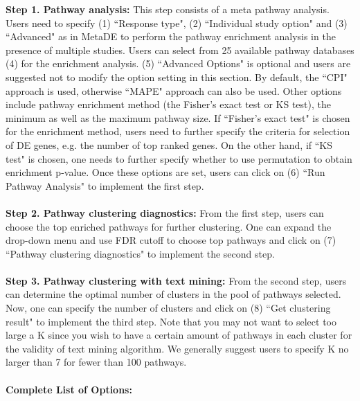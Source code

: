 \textbf{Step 1. Pathway analysis:} This step consists of a meta pathway analysis. Users need to specify (1) ``Response type", (2) ``Individual study option" and (3) ``Advanced" as in MetaDE to perform the pathway enrichment analysis in the presence of multiple studies. Users can select from 25 available pathway databases (4) for the enrichment analysis. (5) ``Advanced Options" is optional and users are suggested not to modify the option setting in this section. By default, the ``CPI" approach is used, otherwise ``MAPE" approach can also be used. Other options include pathway enrichment method (the Fisher's exact test or KS test), the minimum as well as the maximum pathway size. If ``Fisher's exact test" is chosen for the enrichment method, users need to further specify the criteria for selection of DE genes, e.g. the number of top ranked genes. On the other hand, if ``KS test" is chosen, one needs to further specify whether to use permutation to obtain enrichment p-value. Once these options are set, users can click on (6) ``Run Pathway Analysis" to implement the first step. \\~\\

\textbf{Step 2. Pathway clustering diagnostics:} From the first step, users can choose the top enriched pathways for further clustering. One can expand the drop-down menu and use FDR cutoff to choose top pathways and click on (7) ``Pathway clustering diagnostics" to implement the second step. \\~\\

\textbf{Step 3. Pathway clustering with text mining:} From the second step, users can determine the optimal number of clusters in the pool of pathways selected. Now, one can specify the number of clusters and click on (8) ``Get clustering result" to implement the third step. Note that you may not want to select too large a K since you wish to have a certain amount of pathways in each cluster for the validity of text mining algorithm. We generally suggest users to specify K no larger than 7 for fewer than 100 pathways.   \\~\\

\textbf{Complete List of Options:} 

